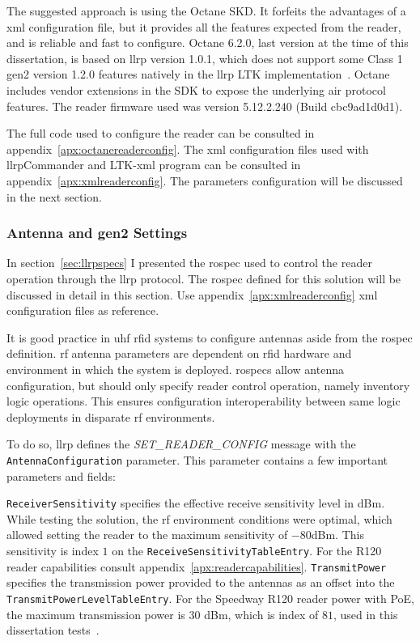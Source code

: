 The suggested approach is using the Octane SKD. It forfeits the advantages of a \ac{xml} configuration file, but it provides all the features expected from the reader, and is reliable and fast to configure.
Octane 6.2.0, last version at the time of this dissertation, is based on \ac{llrp} version 1.0.1, which does not support some Class 1 \ac{gen2} version 1.2.0 features natively in the \ac{llrp} LTK implementation~\cite{ImpinjOctaneLLRP}. Octane includes vendor extensions in the SDK to expose the underlying air protocol features.
The reader firmware used was version 5.12.2.240 (Build cbc9ad1d0d1).

The full code used to configure the reader can be consulted in appendix~\ref{apx:octanereaderconfig}.
The \ac{xml} configuration files used with \ac{llrp}Commander and LTK-\acs{xml} program can be consulted in appendix~\ref{apx:xmlreaderconfig}.
The parameters configuration will be discussed in the next section.

\subsubsection{Antenna and \acs{gen2} Settings}

In section~\ref{sec:llrpspecs} I presented the \ac{rospec} used to control the reader operation through the \ac{llrp} protocol. The \ac{rospec} defined for this solution will be discussed in detail in this section.
Use appendix~\ref{apx:xmlreaderconfig} \ac{xml} configuration files as reference.

It is good practice in \ac{uhf} \ac{rfid} systems to configure antennas aside from the \ac{rospec} definition. \ac{rf} antenna parameters are dependent on \ac{rfid} hardware and environment in which the system is deployed. \acp{rospec} allow antenna configuration, but should only specify reader control operation, namely inventory logic operations. This ensures configuration interoperability between same logic deployments in disparate \ac{rf} environments.

To do so, \ac{llrp} defines the \textit{SET\_READER\_CONFIG} message with the \texttt{AntennaConfiguration} parameter.
This parameter contains a few important parameters and fields:

\texttt{ReceiverSensitivity} specifies the effective receive sensitivity level in dBm. While testing the solution, the \ac{rf} environment conditions were optimal, which allowed setting the reader to the maximum sensitivity of $-80$dBm. This sensitivity is index $1$ on the \texttt{ReceiveSensitivityTableEntry}. For the R120 reader capabilities consult appendix~\ref{apx:readercapabilities}.
\texttt{TransmitPower} specifies the transmission power provided to the antennas as an offset into the \texttt{TransmitPowerLevelTableEntry}. For the Speedway R120 reader power with PoE, the maximum transmission power is $30$ dBm, which is index of $81$, used in this dissertation tests~\cite{ImpinjOctaneLLRP, SettingReceiveSensitivity}.

